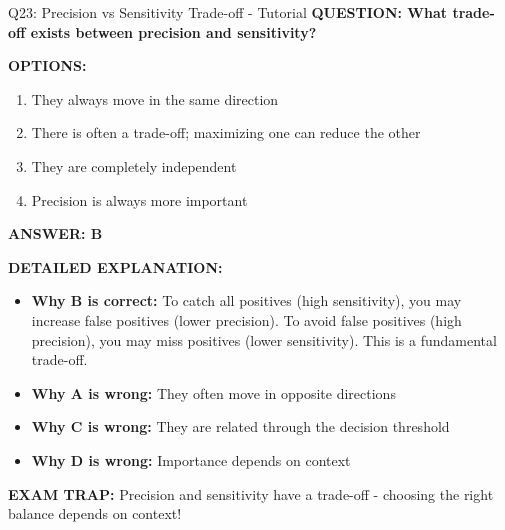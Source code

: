 \documentclass[8pt]{beamer}
\begin{document}
	\begin{frame}{Q23: Precision vs Sensitivity Trade-off - Tutorial}
		\fontsize{6.5}{7.5}\selectfont
		\textbf{QUESTION: What trade-off exists between precision and sensitivity?}
		
		\vspace{0.1cm}
		\textbf{OPTIONS:}
		\begin{enumerate}
			\item They always move in the same direction
			\item There is often a trade-off; maximizing one can reduce the other
			\item They are completely independent
			\item Precision is always more important
		\end{enumerate}
		
		\vspace{0.1cm}
		\textcolor{myblue}{\textbf{ANSWER: B}}
		
		\vspace{0.1cm}
		\textbf{DETAILED EXPLANATION:}
		\begin{itemize}
			\item \textbf{Why B is correct:} To catch all positives (high sensitivity), you may increase false positives (lower precision). To avoid false positives (high precision), you may miss positives (lower sensitivity). This is a fundamental trade-off.
			\item \textbf{Why A is wrong:} They often move in opposite directions
			\item \textbf{Why C is wrong:} They are related through the decision threshold
			\item \textbf{Why D is wrong:} Importance depends on context
		\end{itemize}
		
		\textcolor{myred}{\textbf{EXAM TRAP:}} Precision and sensitivity have a \textcolor{myblue}{trade-off} - choosing the right balance depends on context!
	\end{frame}
	
\end{document}
